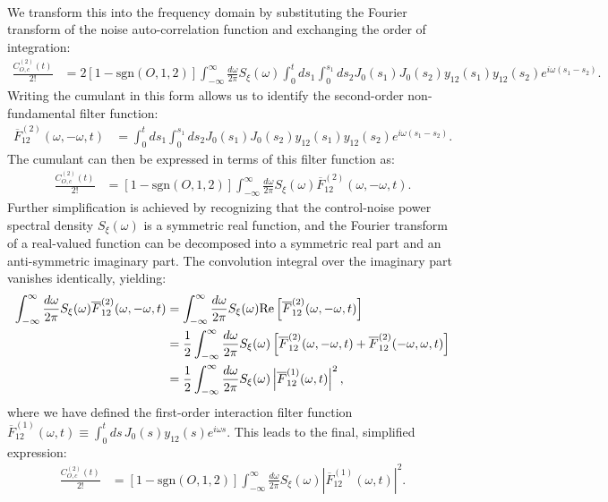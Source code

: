 \documentclass[%
 reprint,
superscriptaddress,
 amsmath,amssymb,
 aps,
pra,
]{revtex4-2}
\begin{document}
\begin{widetext}
\begin{align}
\end{align}
We transform this into the frequency domain by substituting the Fourier transform of the noise auto-correlation function and exchanging the order of integration:
\begin{align}
    \frac{C_{O,c}^{(2)}(t)}{2!}&=2[1-\text{sgn}(O,1,2)]\int_{-\infty}^\infty\frac{d\omega}{2\pi}S_\xi(\omega) \int_0^t ds_1\int_0^{s_1}ds_2 J_0(s_1)J_0(s_2)y_{12}(s_1)y_{12}(s_2)e^{i\omega (s_1-s_2)}.
\end{align}
Writing the cumulant in this form allows us to identify the second-order non-fundamental filter function:
\begin{align}
    \overline{F}^{(2)}_{12}(\omega, -\omega, t)&=\int_0^t ds_1\int_0^{s_1}ds_2 J_0(s_1)J_0(s_2)y_{12}(s_1)y_{12}(s_2)e^{i\omega(s_1-s_2)}.
\end{align}
The cumulant can then be expressed in terms of this filter function as:
\begin{align}
    \frac{C_{O,c}^{(2)}(t)}{2!}&=[1-\text{sgn}(O,1,2)]\int_{-\infty}^\infty\frac{d\omega}{2\pi}S_\xi(\omega)\overline{F}^{(2)}_{12}(\omega, -\omega, t).
\end{align}
Further simplification is achieved by recognizing that the control-noise power spectral density $S_\xi(\omega)$ is a symmetric real function, and the Fourier transform of a real-valued function can be decomposed into a symmetric real part and an anti-symmetric imaginary part. The convolution integral over the imaginary part vanishes identically, yielding:
\begin{align}
    \int_{-\infty}^\infty\frac{d\omega}{2\pi}S_\xi(\omega)\overline{F}^{(2)}_{12}(\omega, -\omega, t) &= \int_{-\infty}^\infty\frac{d\omega}{2\pi}S_\xi(\omega)\text{Re}\left[\overline{F}^{(2)}_{12}(\omega, -\omega, t)\right] \notag\\
    &= \frac{1}{2} \int_{-\infty}^\infty\frac{d\omega}{2\pi}S_\xi(\omega)\left[\overline{F}^{(2)}_{12}(\omega, -\omega, t) + \overline{F}^{(2)}_{12}(-\omega, \omega, t)\right] \notag\\
    &= \frac{1}{2} \int_{-\infty}^\infty\frac{d\omega}{2\pi}S_\xi(\omega)\left|\overline{F}^{(1)}_{12}(\omega, t)\right|^2,
\end{align}
where we have defined the first-order interaction filter function $\overline{F}^{(1)}_{12}(\omega, t) \equiv \int_0^t ds\, J_0(s) y_{12}(s) e^{i\omega s}$. This leads to the final, simplified expression:
\begin{align}
    \frac{C_{O,c}^{(2)}(t)}{2!}&=[1-\text{sgn}(O,1,2)]\int_{-\infty}^\infty\frac{d\omega}{2\pi}S_\xi(\omega)\left|\overline{F}^{(1)}_{12}(\omega, t)\right|^2.
\end{align}


\end{widetext}
\end{document}
